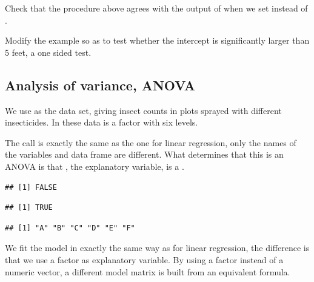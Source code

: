 \documentclass[krantz2]{krantz}\usepackage{knitr}%
\begin{document}
\begin{advplayground}
Check that the procedure above agrees with the output of  when we set  instead of .

Modify the example so as to test whether the intercept is significantly larger than 5 feet, a one sided test.
\end{advplayground}

\subsection{Analysis of variance, ANOVA}\label{sec:anova}
We use as the  data set, giving insect counts in plots sprayed with different insecticides. In these data  is a factor with six levels.%
\label{xmpl:fun:lm:fm4}

The call is exactly the same as the one for linear regression, only the names of the variables and data frame are different. What determines that this is an ANOVA is that , the explanatory variable, is a .

\begin{knitrout}\footnotesize
{}\color{fgcolor}\begin{kframe}
\begin{alltt}
\hlopt{$}
\end{alltt}
\begin{verbatim}
## [1] FALSE
\end{verbatim}
\begin{alltt}
\hlopt{$}
\end{alltt}
\begin{verbatim}
## [1] TRUE
\end{verbatim}
\begin{alltt}
\hlopt{$}
\end{alltt}
\begin{verbatim}
## [1] "A" "B" "C" "D" "E" "F"
\end{verbatim}
\end{kframe}
\end{knitrout}

We fit the model in exactly the same way as for linear regression, the difference is that we use a factor as explanatory variable. By using a factor instead of a numeric vector, a different model matrix is built from an equivalent formula.
\end{document}
